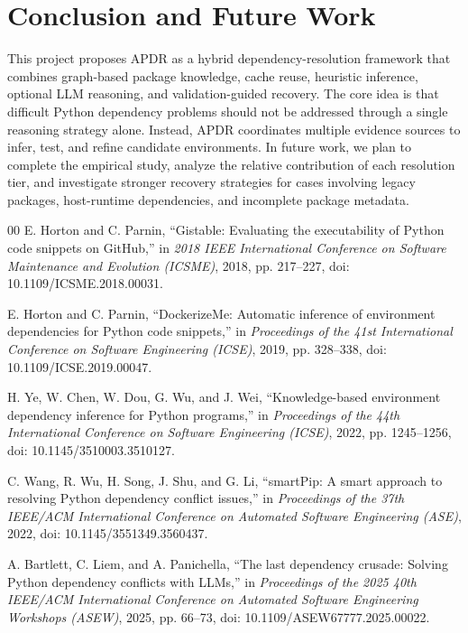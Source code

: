 \documentclass[conference]{IEEEtran}
\begin{document}
\section{Conclusion and Future Work}
This project proposes APDR as a hybrid dependency-resolution framework that combines graph-based package knowledge, cache reuse, heuristic inference, optional LLM reasoning, and validation-guided recovery. The core idea is that difficult Python dependency problems should not be addressed through a single reasoning strategy alone. Instead, APDR coordinates multiple evidence sources to infer, test, and refine candidate environments. In future work, we plan to complete the empirical study, analyze the relative contribution of each resolution tier, and investigate stronger recovery strategies for cases involving legacy packages, host-runtime dependencies, and incomplete package metadata.

\begin{thebibliography}{00}
 E. Horton and C. Parnin, ``Gistable: Evaluating the executability of Python code snippets on GitHub,'' in \textit{2018 IEEE International Conference on Software Maintenance and Evolution (ICSME)}, 2018, pp. 217--227, doi: 10.1109/ICSME.2018.00031.

 E. Horton and C. Parnin, ``DockerizeMe: Automatic inference of environment dependencies for Python code snippets,'' in \textit{Proceedings of the 41st International Conference on Software Engineering (ICSE)}, 2019, pp. 328--338, doi: 10.1109/ICSE.2019.00047.

 H. Ye, W. Chen, W. Dou, G. Wu, and J. Wei, ``Knowledge-based environment dependency inference for Python programs,'' in \textit{Proceedings of the 44th International Conference on Software Engineering (ICSE)}, 2022, pp. 1245--1256, doi: 10.1145/3510003.3510127.

 C. Wang, R. Wu, H. Song, J. Shu, and G. Li, ``smartPip: A smart approach to resolving Python dependency conflict issues,'' in \textit{Proceedings of the 37th IEEE/ACM International Conference on Automated Software Engineering (ASE)}, 2022, doi: 10.1145/3551349.3560437.

 A. Bartlett, C. Liem, and A. Panichella, ``The last dependency crusade: Solving Python dependency conflicts with LLMs,'' in \textit{Proceedings of the 2025 40th IEEE/ACM International Conference on Automated Software Engineering Workshops (ASEW)}, 2025, pp. 66--73, doi: 10.1109/ASEW67777.2025.00022.
\end{thebibliography}
\end{document}
